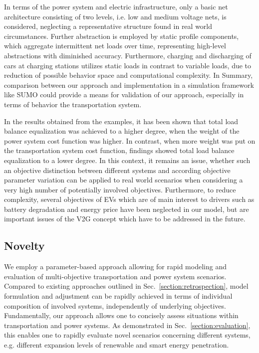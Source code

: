 In terms of the power system and electric infrastructure, only a basic net architecture consisting of two levels, i.e. low and medium voltage nets, is considered, neglecting a representative structure found in real world circumstances. Further abstraction is employed by static profile components, which aggregate intermittent net loads over time, representing high-level abstractions with diminished accuracy. Furthermore, charging and discharging of cars at charging stations utilizes static loads in contrast to variable loads, due to reduction of possible behavior space and computational complexity. In Summary, comparison between our approach and implementation in a simulation framework like SUMO could provide a means for validation of our approach, especially in terms of behavior the transportation system.

In the results obtained from the examples, it has been shown that total load balance equalization was achieved to a higher degree, when the weight of the power system cost function was higher. In contrast, when more weight was put on the transportation system cost function, findings showed total load balance equalization to a lower degree. In this context, it remains an issue, whether such an objective distinction between different systems and according objective parameter variation can be applied to real world scenarios when considering a very high number of potentially involved objectives. Furthermore, to reduce complexity, several objectives of EVs which are of main interest to drivers such as battery degradation and energy price have been neglected in our model, but are important issues of the V2G concept which have to be addressed in the future.

\subsection{Novelty}

We employ a parameter-based approach allowing for rapid modeling and evaluation of multi-objective transportation and power system scenarios. Compared to existing approaches outlined in Sec.~\ref{section:retrospection}, model formulation and adjustment can be rapidly achieved in terms of individual composition of involved systems, independently of underlying objectives. Fundamentally, our approach allows one to concisely assess situations within transportation and power systems. As demonstrated in Sec.~\ref{section:evaluation}, this enables one to rapidly evaluate novel scenarios concerning different systems, e.g. different expansion levels of renewable and smart energy penetration. 

